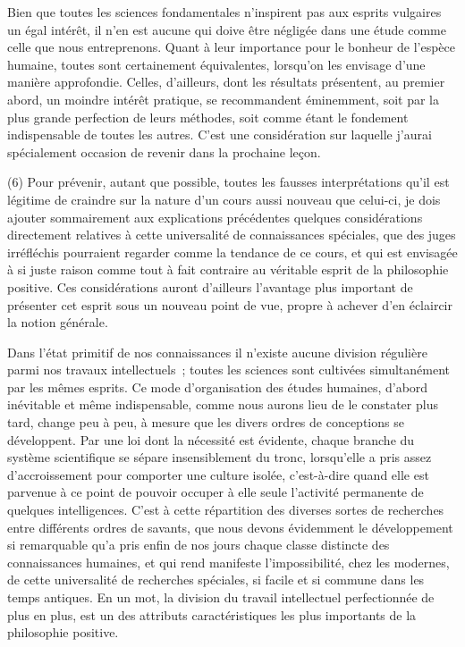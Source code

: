 \documentclass[french,twoside]{book} %
\begin{document}
Bien que toutes les sciences fondamentales n’inspirent pas aux esprits vulgaires un égal intérêt, il n’en est aucune qui doive être négligée dans une étude comme celle que nous entreprenons. Quant à leur importance pour le bonheur de l’espèce humaine, toutes sont certainement équivalentes, lorsqu’on les envisage d’une manière approfondie. Celles, d’ailleurs, dont les résultats présentent, au premier abord, un moindre intérêt pratique, se recommandent éminemment, soit par la plus grande perfection de leurs méthodes, soit comme étant le fondement indispensable de toutes les autres. C’est une considération sur laquelle j’aurai spécialement occasion de revenir dans la prochaine leçon.\par
(6) Pour prévenir, autant que possible, toutes les fausses interprétations qu’il est légitime de craindre sur la nature d’un cours aussi nouveau que celui-ci, je dois ajouter sommairement aux explications précédentes quelques considérations directement relatives à cette universalité de connaissances spéciales, que des juges irréfléchis pourraient regarder comme la tendance de ce cours, et qui est envisagée à si juste raison comme tout à fait contraire au véritable esprit de la philosophie positive. Ces considérations auront d’ailleurs l’avantage plus important de présenter cet esprit sous un nouveau point de vue, propre à achever d’en éclaircir la notion générale.\par
Dans l’état primitif de nos connaissances il n’existe aucune division régulière parmi nos travaux intellectuels ; toutes les sciences sont cultivées simultanément par les mêmes esprits. Ce mode d’organisation des études humaines, d’abord inévitable et même indispensable, comme nous aurons lieu de le constater plus tard, change peu à peu, à mesure que les divers ordres de conceptions se développent. Par une loi dont la nécessité est évidente, chaque branche du système scientifique se sépare insensiblement du tronc, lorsqu’elle a pris assez d’accroissement pour comporter une culture isolée, c’est-à-dire quand elle est parvenue à ce point de pouvoir occuper à elle seule l’activité permanente de quelques intelligences. C’est à cette répartition des diverses sortes de recherches entre différents ordres de savants, que nous devons évidemment le développement si remarquable qu’a pris enfin de nos jours chaque classe distincte des connaissances humaines, et qui rend manifeste l’impossibilité, chez les modernes, de cette universalité de recherches spéciales, si facile et si commune dans les temps antiques. En un mot, la division du travail intellectuel perfectionnée de plus en plus, est un des attributs caractéristiques les plus importants de la philosophie positive.\par
\end{document}

